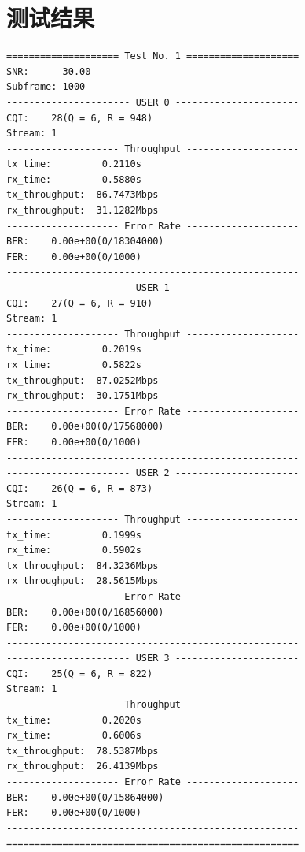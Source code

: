 \documentclass{article}
\begin{document}
\section{测试结果}
\begin{lstlisting}
==================== Test No. 1 ====================
SNR:      30.00
Subframe: 1000
---------------------- USER 0 ----------------------
CQI:    28(Q = 6, R = 948)
Stream: 1
-------------------- Throughput --------------------
tx_time:         0.2110s
rx_time:         0.5880s
tx_throughput:  86.7473Mbps
rx_throughput:  31.1282Mbps
-------------------- Error Rate --------------------
BER:    0.00e+00(0/18304000)
FER:    0.00e+00(0/1000)
----------------------------------------------------
---------------------- USER 1 ----------------------
CQI:    27(Q = 6, R = 910)
Stream: 1
-------------------- Throughput --------------------
tx_time:         0.2019s
rx_time:         0.5822s
tx_throughput:  87.0252Mbps
rx_throughput:  30.1751Mbps
-------------------- Error Rate --------------------
BER:    0.00e+00(0/17568000)
FER:    0.00e+00(0/1000)
----------------------------------------------------
---------------------- USER 2 ----------------------
CQI:    26(Q = 6, R = 873)
Stream: 1
-------------------- Throughput --------------------
tx_time:         0.1999s
rx_time:         0.5902s
tx_throughput:  84.3236Mbps
rx_throughput:  28.5615Mbps
-------------------- Error Rate --------------------
BER:    0.00e+00(0/16856000)
FER:    0.00e+00(0/1000)
----------------------------------------------------
---------------------- USER 3 ----------------------
CQI:    25(Q = 6, R = 822)
Stream: 1
-------------------- Throughput --------------------
tx_time:         0.2020s
rx_time:         0.6006s
tx_throughput:  78.5387Mbps
rx_throughput:  26.4139Mbps
-------------------- Error Rate --------------------
BER:    0.00e+00(0/15864000)
FER:    0.00e+00(0/1000)
----------------------------------------------------
====================================================


\end{lstlisting}
\end{document}
